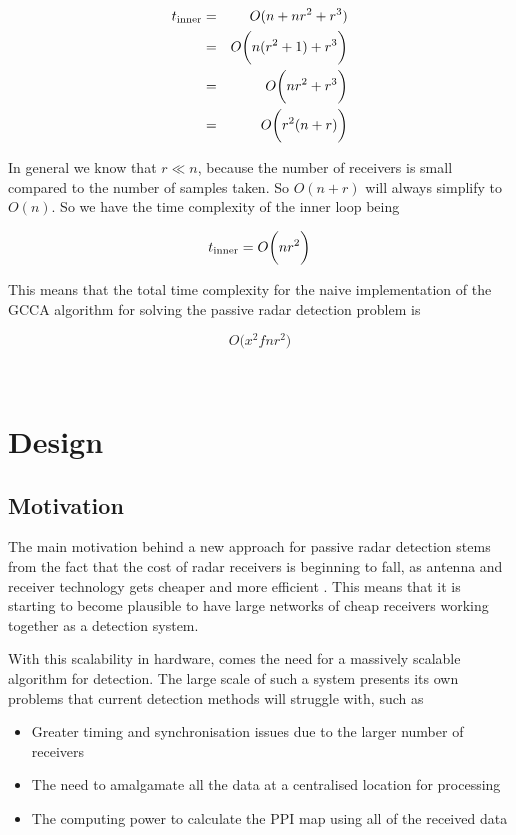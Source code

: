 \documentclass[12pt,openany,a4paper]{book}
\begin{document}
\begin{eqnarray}
t_{\textnormal{inner}} &=& O(n + nr^2 + r^3)\\
&=& O\bigg( n(r^2 + 1) + r^3 \bigg) \\
&=& O\bigg( nr^2 + r^3 \bigg) \\
&=& O\bigg( r^2 (n + r) \bigg) \\
\end{eqnarray}

In general we know that $r \ll n$, because the number of receivers is small compared to the number of samples taken. So $O(n + r)$ will always simplify to $O(n)$. So we have the time complexity of the inner loop being

\begin{equation}
t_{\textnormal{inner}} = O\bigg( nr^2 \bigg)
\end{equation}

This means that the total time complexity for the naive implementation of the GCCA algorithm for solving the passive radar detection problem is

\begin{equation}
\label{eqn:time1}
O\bigg(x^2f nr^2 \bigg)
\end{equation}

\cleardoublepage

\verb+ +
\cleardoublepage

\chapter{Design}

\section{Motivation}
The main motivation behind a new approach for passive radar detection stems from the fact that the cost of radar receivers is beginning to fall, as antenna and receiver technology gets cheaper and more efficient \cite{CMOS,lowCost}. This means that it is starting to become plausible to have large networks of cheap receivers working together as a detection system.

\bigskip

With this scalability in hardware, comes the need for a massively scalable algorithm for detection. The large scale of such a system presents its own problems that current detection methods will struggle with, such as

\begin{itemize}
	\item{Greater timing and synchronisation issues due to the larger number of receivers}
	\item{The need to amalgamate all the data at a centralised location for processing}
	\item{The computing power to calculate the PPI map using all of the received data}
\end{itemize}
\end{document}

